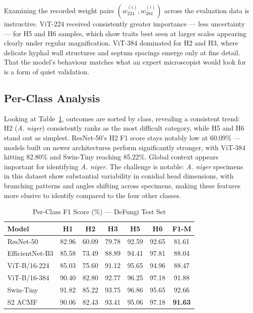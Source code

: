 \documentclass[conference]{IEEEtran}
\begin{document}
Examining the recorded weight pairs $(w^{(i)}_{224}, w^{(i)}_{384})$ across
the evaluation data is instructive. ViT-224 received consistently greater
importance --- less uncertainty --- for H5 and H6 samples, which show traits
best seen at larger scales appearing clearly under regular magnification.
ViT-384 dominated for H2 and H3, where delicate hyphal wall structures and
septum spacings emerge only at fine detail. That the model's behaviour matches
what an expert microscopist would look for is a form of quiet validation.

\subsection{Per-Class Analysis}

Looking at Table~\ref{tab:perclass}, outcomes are sorted by class, revealing
a consistent trend: H2 (\textit{A. niger}) consistently ranks as the most
difficult category, while H5 and H6 stand out as simplest. ResNet-50's H2 F1
score stays notably low at 60.09\% --- models built on newer architectures
perform significantly stronger, with ViT-384 hitting 82.80\% and Swin-Tiny
reaching 85.22\%. Global context appears important for identifying
\textit{A. niger}. The challenge is notable: \textit{A. niger} specimens in
this dataset show substantial variability in conidial head dimensions, with
branching patterns and angles shifting across specimens, making these features
more elusive to identify compared to the four other classes.

\begin{table}[!t]
  \caption{Per-Class F1 Score (\%) --- DeFungi Test Set}
  \label{tab:perclass}
  \centering
  \footnotesize\setlength{\tabcolsep}{3pt}
  \begin{tabular}{lcccccc}
    \toprule
    \textbf{Model} & \textbf{H1} & \textbf{H2} & \textbf{H3} & \textbf{H5} & \textbf{H6} & \textbf{F1-M}\\
    \midrule
    ResNet-50        & 82.96 & 60.09 & 79.78 & 92.59 & 92.65 & 81.61 \\
    EfficientNet-B3  & 85.58 & 73.49 & 88.89 & 94.41 & 97.81 & 88.04 \\
    ViT-B/16-224     & 85.03 & 75.60 & 91.12 & 95.65 & 94.96 & 88.47 \\
    ViT-B/16-384     & 90.40 & 82.80 & 92.77 & 96.25 & 97.18 & 91.88 \\
    Swin-Tiny        & 91.82 & 85.22 & 93.75 & 96.86 & 95.65 & 92.66 \\
    \midrule
    S2 ACMF          & 90.06 & 82.43 & 93.41 & 95.06 & 97.18 & \textbf{91.63}\\
    \bottomrule
  \end{tabular}
\end{table}
\end{document}
